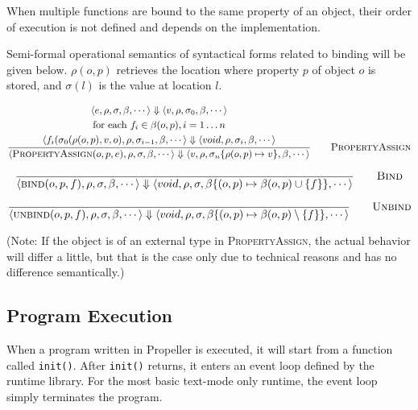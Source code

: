 When multiple functions are bound to the same property of an object, their order of execution is not
defined and depends on the implementation.

Semi-formal operational semantics of syntactical forms related to binding will be given below.
$\rho(o, p)$ retrieves the location where property $p$ of object $o$ is stored, and $\sigma(l)$ is
the value at location $l$.

$$
\dfrac{\begin{gathered}
\langle e,\rho,\sigma,\beta,\cdots \rangle \Downarrow
\langle v,\rho,\sigma_0,\beta,\cdots \rangle\\
\textrm{for each } f_i\in\beta(o, p), i=1\dots n\\
\langle f_i(\sigma_0(\rho(o,p),v,o),\rho,\sigma_{i-1},\beta,\cdots \rangle \Downarrow
\langle void,\rho,\sigma_i,\beta,\cdots \rangle
\end{gathered}
}
{\langle \textsc{PropertyAssign}(o,p,e),\rho,\sigma,\beta,\cdots \rangle
\Downarrow
\langle v,\rho,\sigma_n\{\rho(o,p)\mapsto v\},\beta,\cdots \rangle
} \qquad \textsc{PropertyAssign}
$$

$$
\dfrac{}
{\langle \textsc{bind}(o,p,f),\rho,\sigma,\beta,\cdots \rangle
\Downarrow
\langle void,\rho,\sigma,\beta\{(o,p)\mapsto \beta(o,p)\cup \{f\}\},\cdots \rangle
} \qquad \textsc{Bind}
$$

$$
\dfrac{}
{\langle \textsc{unbind}(o,p,f),\rho,\sigma,\beta,\cdots \rangle
\Downarrow
\langle void,\rho,\sigma,\beta\{(o,p)\mapsto \beta(o,p)\setminus \{f\}\},\cdots \rangle
} \qquad \textsc{Unbind}
$$

(Note: If the object is of an external type in \textsc{PropertyAssign}, the actual behavior will
differ a little, but that is the case only due to technical reasons and has no difference
semantically.)

\subsection{Program Execution}

When a program written in Propeller is executed, it will start from a function called \verb|init()|.
After \verb|init()| returns, it enters an event loop defined by the runtime library. For the
most basic text-mode only runtime, the event loop simply terminates the program.


